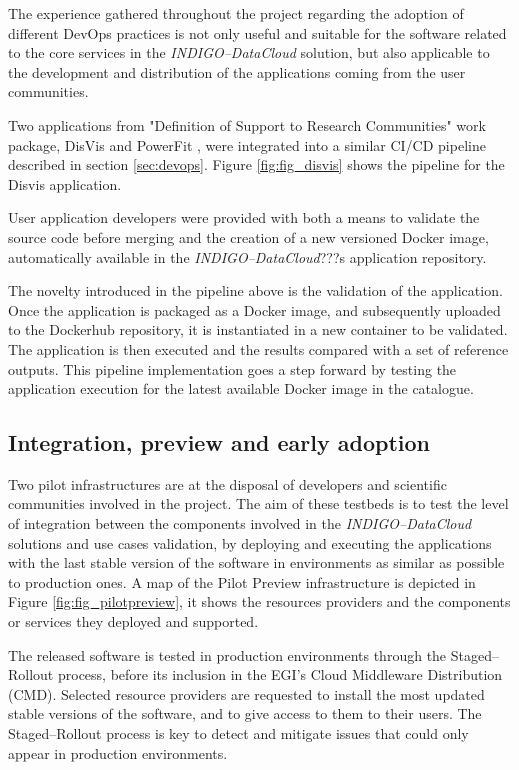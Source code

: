 \documentclass[journal]{IEEEtran}
\begin{document}
The experience gathered throughout the project regarding the adoption of
different DevOps practices is not only useful and suitable for the software related
to the core services in the {\sl INDIGO--DataCloud} solution, but also applicable to the
development and distribution of the applications coming from the user communities.

Two applications from "Definition of Support to Research Communities" work package,
DisVis \cite{disvis} and PowerFit \cite{powerfit}, were
integrated into a similar CI/CD pipeline described in section \ref{sec:devops}.
Figure \ref{fig:fig_disvis} shows the pipeline for the Disvis application.

User application developers were provided with both a means to validate the
source code before merging and the creation of a new versioned Docker image,
automatically available in the {\sl INDIGO--DataCloud}???s application repository.

The novelty introduced in the pipeline above is the validation of the application.
Once the application is packaged as a Docker image, and subsequently uploaded
to the Dockerhub repository, it is instantiated in a new container to be validated.
The application is then executed and the results compared with a set of reference outputs.
This pipeline implementation goes a step forward by testing the application
execution for the latest available Docker image in the catalogue.


\subsection{Integration, preview and early adoption}

Two pilot infrastructures are at the disposal of developers and scientific
communities involved in the project. The aim of these testbeds is to test the
level of integration between the components involved in the {\sl INDIGO--DataCloud}
solutions and use cases validation, by deploying and executing the applications
with the last stable version of the software in environments as similar as
possible to production ones. A map of the Pilot Preview
infrastructure is depicted in Figure \ref{fig:fig_pilotpreview}, it shows the
resources providers and the components or services they deployed and supported.

The released software is tested in production environments through the
Staged--Rollout process, before its inclusion in the EGI's Cloud Middleware Distribution (CMD).
Selected resource providers are requested to install
the most updated stable versions of the software, and to give access to them to their users. The
Staged--Rollout process is key to detect and mitigate issues that could only
appear in production environments.
\end{document}

